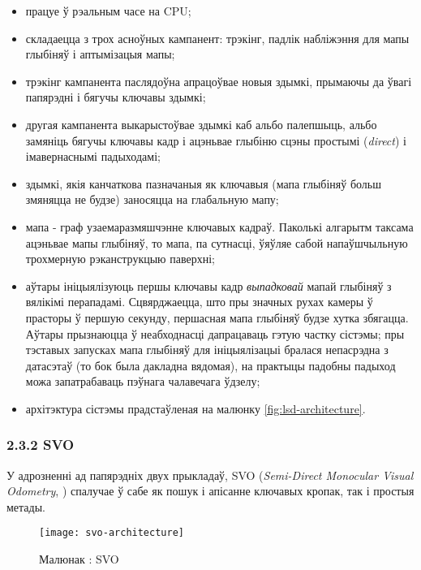 \begin{itemize}
  \item працуе ў рэальным часе на CPU;
  \item складаецца з трох асноўных кампанент: трэкінг, падлік набліжэння для мапы
  глыбіняў і аптымізацыя мапы;
  \item трэкінг кампанента паслядоўна апрацоўвае новыя здымкі, прымаючы да ўвагі
  папярэдні і бягучы ключавы здымкі;
  \item другая кампанента выкарыстоўвае здымкі каб альбо палепшыць, альбо замяніць
  бягучы ключавы кадр і ацэньвае глыбіню сцэны простымі (\textit{direct})
  і імавернаснымі падыходамі;
  \item здымкі, якія канчаткова пазначаныя як ключавыя (мапа глыбіняў больш
  змяняцца не будзе) заносяцца на глабальную мапу;
  \item мапа - граф узаемаразмяшчэнне ключавых кадраў. Паколькі алгарытм таксама
  ацэньвае мапы глыбіняў, то мапа, па сутнасці, ўяўляе сабой напаўшчыльную
  трохмерную рэканструкцыю паверхні;
  \item аўтары ініцыялізуюць першы ключавы кадр \textit{выпадковай} мапай глыбіняў
  з вялікімі перападамі. Сцвярджаецца, што пры значных рухах камеры ў прасторы
  ў першую секунду, першасная мапа глыбіняў будзе хутка збягацца. Аўтары прызнаюцца
  ў неабходнасці дапрацаваць гэтую частку сістэмы; пры тэставых запусках мапа
  глыбіняў для ініцыялізацыі бралася непасрэдна з датасэтаў (то бок была дакладна
  вядомая), на практыцы падобны падыход можа запатрабаваць пэўнага чалавечага ўдзелу;
  \item архітэктура сістэмы прадстаўленая на малюнку \ref{fig:lsd-architecture}.
\end{itemize}

\subsubsection*{2.3.2 SVO}

У адрозненні ад папярэдніх двух прыкладаў, SVO (\textit{Semi-Direct Monocular Visual Odometry},
\cite{Forster2014ICRA}) спалучае ў сабе як пошук і апісанне ключавых кропак, так і
простыя метады.

\begin{figure}[H]
  \centering
  \texttt{[image: svo-architecture]}
  \captionsetup{labelformat=empty}
  \caption{Малюнак : SVO}
  \label{fig:svo-architecture}
\end{figure}

